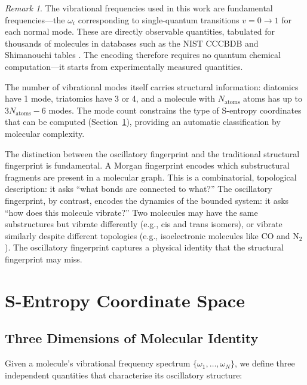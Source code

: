 \documentclass[11pt,a4paper]{article}
\theoremstyle{definition}
\theoremstyle{remark}
\newtheorem{remark}[theorem]{Remark}
\begin{document}
\begin{remark}
The vibrational frequencies used in this work are fundamental frequencies---the $\omega_i$ corresponding to single-quantum transitions $v = 0 \to 1$ for each normal mode. These are directly observable quantities, tabulated for thousands of molecules in databases such as the NIST CCCBDB \citep{johnson2022} and Shimanouchi tables \citep{shimanouchi1972}. The encoding therefore requires no quantum chemical computation---it starts from experimentally measured quantities.
\end{remark}

The number of vibrational modes itself carries structural information: diatomics have 1 mode, triatomics have 3 or 4, and a molecule with $N_{\mathrm{atoms}}$ atoms has up to $3N_{\mathrm{atoms}} - 6$ modes. The mode count constrains the type of S-entropy coordinates that can be computed (Section~\ref{sec:s_entropy}), providing an automatic classification by molecular complexity.

The distinction between the oscillatory fingerprint and the traditional structural fingerprint is fundamental. A Morgan fingerprint \citep{rogers2010} encodes which substructural fragments are present in a molecular graph. This is a combinatorial, topological description: it asks ``what bonds are connected to what?'' The oscillatory fingerprint, by contrast, encodes the dynamics of the bounded system: it asks ``how does this molecule vibrate?'' Two molecules may have the same substructures but vibrate differently (e.g., cis and trans isomers), or vibrate similarly despite different topologies (e.g., isoelectronic molecules like CO and N$_2$). The oscillatory fingerprint captures a physical identity that the structural fingerprint may miss.

\section{S-Entropy Coordinate Space}
\label{sec:s_entropy}

\subsection{Three Dimensions of Molecular Identity}

Given a molecule's vibrational frequency spectrum $\{\omega_1, \ldots, \omega_N\}$, we define three independent quantities that characterise its oscillatory structure:
\end{document}

